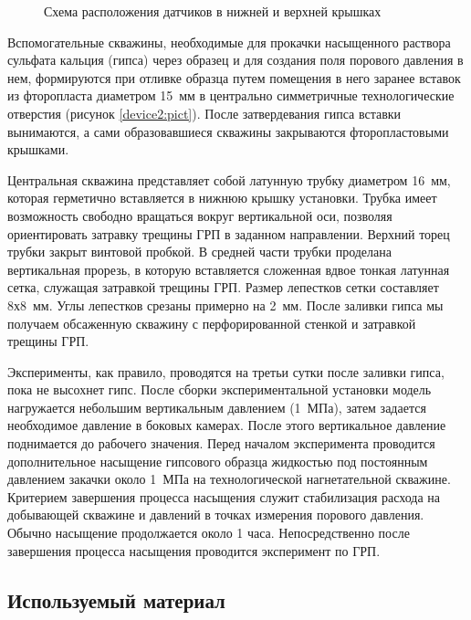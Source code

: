 \begin{figure}[hb]
\begin{center}
\end{center}
\caption{Схема расположения датчиков в нижней и верхней крышках}\label{device3:pict}
\end{figure}

Вспомогательные скважины, необходимые для прокачки насыщенного раствора сульфата кальция (гипса) через образец и для создания поля порового давления в нем, формируются при отливке образца путем помещения в него заранее вставок из фторопласта диаметром 15~мм в центрально симметричные технологические отверстия (рисунок \ref{device2:pict}). После затвердевания гипса вставки вынимаются, а сами образовавшиеся скважины закрываются фторопластовыми крышками.

Центральная скважина представляет собой латунную трубку диаметром 16~мм, которая герметично вставляется в нижнюю крышку установки. Трубка имеет возможность свободно вращаться вокруг вертикальной оси, позволяя ориентировать затравку трещины ГРП в заданном направлении. Верхний торец трубки закрыт винтовой пробкой. В средней части трубки проделана вертикальная прорезь, в которую вставляется сложенная вдвое тонкая латунная сетка, служащая затравкой трещины ГРП. Размер лепестков сетки составляет 8х8~мм. Углы лепестков срезаны примерно на 2~мм. После заливки гипса мы получаем обсаженную скважину с перфорированной стенкой и затравкой трещины ГРП.

Эксперименты, как правило, проводятся на третьи сутки после заливки гипса, пока не высохнет гипс. После сборки экспериментальной установки модель нагружается небольшим вертикальным давлением (1~МПа), затем задается необходимое давление в боковых камерах. После этого вертикальное давление поднимается до рабочего значения. Перед началом эксперимента проводится дополнительное насыщение гипсового образца жидкостью под постоянным давлением закачки около 1~МПа на технологической нагнетательной скважине. Критерием завершения процесса насыщения служит стабилизация расхода на добывающей скважине и давлений в точках измерения порового давления. Обычно насыщение продолжается около 1 часа. Непосредственно после завершения процесса насыщения проводится эксперимент по ГРП.

\subsection{Используемый материал}

